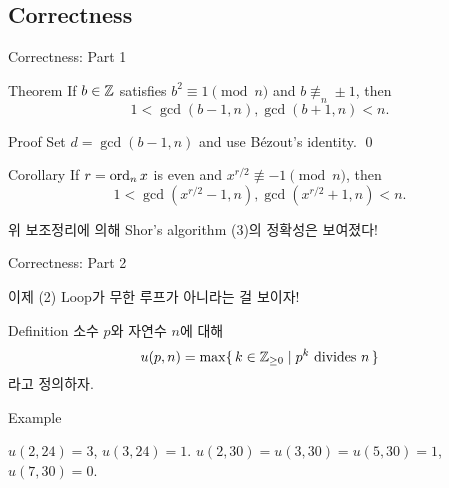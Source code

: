 \documentclass[../240513_msquare_shor.tex]{subfiles}
\begin{document}
\subsection{Correctness}
\begin{frame}{Correctness: Part 1}
    \begin{block}{Theorem}
        If \(b \in \mathbb{Z}\) satisfies \(b^2 \equiv 1 \pmod{n}\) and \(b \not\equiv_n \pm 1\),
        then \[ 1 < \gcd(b - 1, n), \gcd(b+1, n) < n\text{.} \]
    \end{block}
    \pause
    \begin{exampleblock}{Proof}
        Set \(d = \gcd(b - 1, n)\) and use B\'ezout's identity. \qed
    \end{exampleblock}
    \pause
    \begin{block}{Corollary}
        If \(r = \operatorname{ord}_n x\) is even and \(x^{r/2} \not\equiv -1 \pmod{n}\),
        then \[ 1 < \gcd(x^{r/2} - 1, n), \gcd(x^{r/2}+1, n) < n\text{.} \]
    \end{block}
    \begin{exampleblock}{}
        위 보조정리에 의해 Shor's algorithm (3)의 정확성은 보여졌다!
    \end{exampleblock}
\end{frame}

\begin{frame}{Correctness: Part 2}
    \begin{exampleblock}{}
        이제 (2) Loop가 무한 루프가 아니라는 걸 보이자!
    \end{exampleblock}
    \begin{block}{Definition}
        소수 \(p\)와 자연수 \(n\)에 대해
        \[
            u(p, n) = \max \{\,k \in \mathbb{Z}_{\ge 0} \mid p^k~\text{divides}~n\,\}
        \]
        라고 정의하자.
    \end{block}
    \begin{exampleblock}{Example}
        \begin{itemize}
            \ii \(u(2, 24) = 3\), \(u(3, 24) = 1\).
            \ii \(u(2, 30) = u(3, 30) = u(5, 30) = 1\), \(u(7, 30) = 0\).
        \end{itemize}
    \end{exampleblock}
\end{frame}
\end{document}
